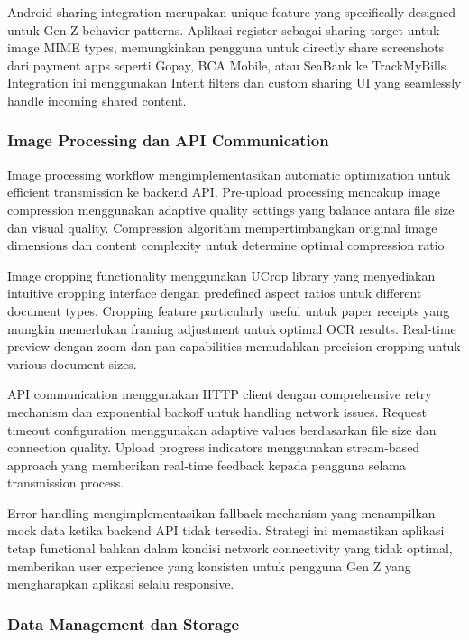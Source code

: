Android sharing integration merupakan unique feature yang specifically designed untuk Gen Z behavior patterns. Aplikasi register sebagai sharing target untuk image MIME types, memungkinkan pengguna untuk directly share screenshots dari payment apps seperti Gopay, BCA Mobile, atau SeaBank ke TrackMyBills. Integration ini menggunakan Intent filters dan custom sharing UI yang seamlessly handle incoming shared content.

\subsubsection{Image Processing dan API Communication}
\label{subsubsec:image-processing-api}

Image processing workflow mengimplementasikan automatic optimization untuk efficient transmission ke backend API. Pre-upload processing mencakup image compression menggunakan adaptive quality settings yang balance antara file size dan visual quality. Compression algorithm mempertimbangkan original image dimensions dan content complexity untuk determine optimal compression ratio.

Image cropping functionality menggunakan UCrop library yang menyediakan intuitive cropping interface dengan predefined aspect ratios untuk different document types. Cropping feature particularly useful untuk paper receipts yang mungkin memerlukan framing adjustment untuk optimal OCR results. Real-time preview dengan zoom dan pan capabilities memudahkan precision cropping untuk various document sizes.

API communication menggunakan HTTP client dengan comprehensive retry mechanism dan exponential backoff untuk handling network issues. Request timeout configuration menggunakan adaptive values berdasarkan file size dan connection quality. Upload progress indicators menggunakan stream-based approach yang memberikan real-time feedback kepada pengguna selama transmission process.

Error handling mengimplementasikan fallback mechanism yang menampilkan mock data ketika backend API tidak tersedia. Strategi ini memastikan aplikasi tetap functional bahkan dalam kondisi network connectivity yang tidak optimal, memberikan user experience yang konsisten untuk pengguna Gen Z yang mengharapkan aplikasi selalu responsive.

\subsubsection{Data Management dan Storage}
\label{subsubsec:data-management}

